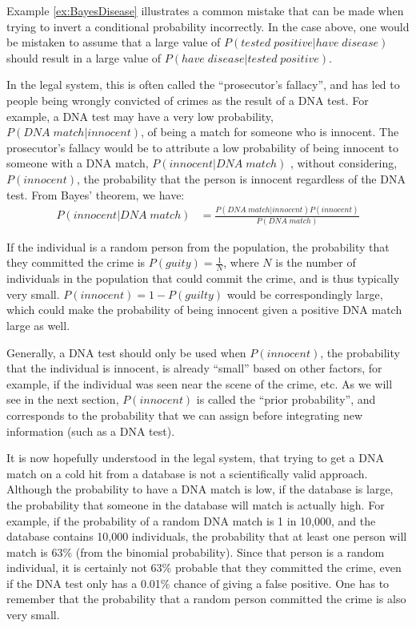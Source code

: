 Example \ref{ex:BayesDisease} illustrates a common mistake that can be made when trying to invert a conditional probability incorrectly. In the case above, one would be mistaken to assume that a large value of $P(tested\; positive | have\; disease)$ should result in a large value of $P(have\; disease|tested\; positive)$.

In the legal system, this is often called the ``prosecutor's fallacy'', and has led to people being wrongly convicted of crimes as the result of a DNA test. For example, a DNA test may have a very low probability, $P(DNA\;match|innocent)$, of being a match for someone who is innocent. The prosecutor's fallacy would be to attribute a low probability of being innocent to someone with a DNA match, $P(innocent|DNA\;match)$ , without considering, $P(innocent)$, the probability that the person is innocent regardless of the DNA test. From Bayes' theorem, we have:
\begin{align*}
P(innocent|DNA\;match) &= \frac{P(DNA\;match | innocent)P(innocent)}{P(DNA\;match)}
\end{align*}

If the individual is a random person from the population, the probability that they committed the crime is $P(guity)=\frac{1}{N}$, where $N$ is the number of individuals in the population that could commit the crime, and is thus typically very small. $P(innocent)=1-P(guilty)$ would be correspondingly large, which could make the probability of being innocent given a positive DNA match large as well.

Generally, a DNA test should only be used when $P(innocent)$, the probability that the individual is innocent, is already ``small'' based on other factors, for example, if the individual was seen near the scene of the crime, etc. As we will see in the next section, $P(innocent)$ is called the ``prior probability'', and corresponds to the probability that we can assign before integrating new information (such as a DNA test).

It is now hopefully understood in the legal system, that trying to get a DNA match on a cold hit from a database is not a scientifically valid approach. Although the probability to have a DNA match is low, if the database is large, the probability that someone in the database will match is actually high. For example, if the probability of a random DNA match is 1 in 10,000, and the database contains 10,000 individuals, the probability that at least one person will match is 63\% (from the binomial probability). Since that person is a random individual, it is certainly not 63\% probable that they committed the crime, even if the DNA test only has a 0.01\% chance of giving a false positive. One has to remember that the probability that a random person committed the crime is also very small. 

